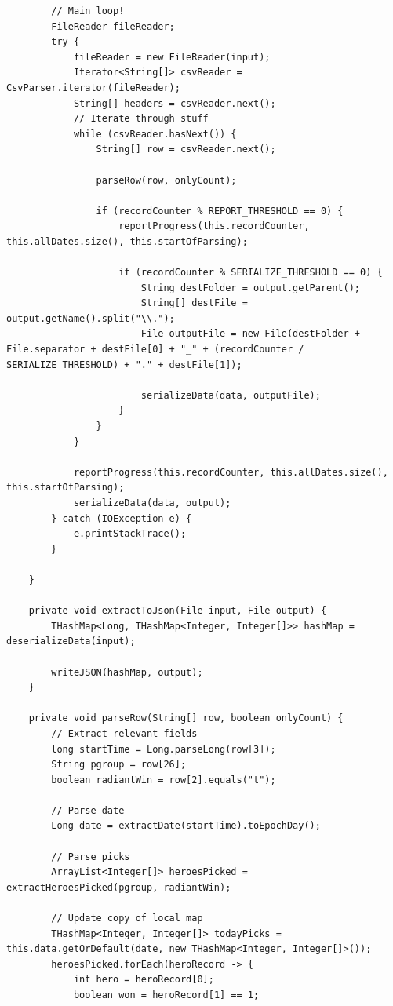 \begin{verbatim}
        // Main loop!
        FileReader fileReader;
        try {
            fileReader = new FileReader(input);
            Iterator<String[]> csvReader = CsvParser.iterator(fileReader);
            String[] headers = csvReader.next();
            // Iterate through stuff
            while (csvReader.hasNext()) {
                String[] row = csvReader.next();

                parseRow(row, onlyCount);

                if (recordCounter % REPORT_THRESHOLD == 0) {
                    reportProgress(this.recordCounter, this.allDates.size(), this.startOfParsing);

                    if (recordCounter % SERIALIZE_THRESHOLD == 0) {
                        String destFolder = output.getParent();
                        String[] destFile = output.getName().split("\\.");
                        File outputFile = new File(destFolder + File.separator + destFile[0] + "_" + (recordCounter / SERIALIZE_THRESHOLD) + "." + destFile[1]);

                        serializeData(data, outputFile);
                    }
                }
            }

            reportProgress(this.recordCounter, this.allDates.size(), this.startOfParsing);
            serializeData(data, output);
        } catch (IOException e) {
            e.printStackTrace();
        }

    }

    private void extractToJson(File input, File output) {
        THashMap<Long, THashMap<Integer, Integer[]>> hashMap = deserializeData(input);

        writeJSON(hashMap, output);
    }

    private void parseRow(String[] row, boolean onlyCount) {
        // Extract relevant fields
        long startTime = Long.parseLong(row[3]);
        String pgroup = row[26];
        boolean radiantWin = row[2].equals("t");

        // Parse date
        Long date = extractDate(startTime).toEpochDay();

        // Parse picks
        ArrayList<Integer[]> heroesPicked = extractHeroesPicked(pgroup, radiantWin);

        // Update copy of local map
        THashMap<Integer, Integer[]> todayPicks = this.data.getOrDefault(date, new THashMap<Integer, Integer[]>());
        heroesPicked.forEach(heroRecord -> {
            int hero = heroRecord[0];
            boolean won = heroRecord[1] == 1;


\end{verbatim}
